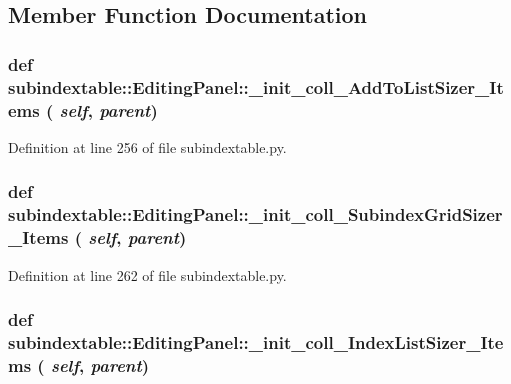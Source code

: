 \subsection{Member Function Documentation}
\hypertarget{classsubindextable_1_1EditingPanel_81852f5b97f68e5709560a4ff0d285fe}{
\subsubsection[\_\-init\_\-coll\_\-AddToListSizer\_\-Items]{\setlength{\rightskip}{0pt plus 5cm}def subindextable::Editing\-Panel::\_\-init\_\-coll\_\-Add\-To\-List\-Sizer\_\-Items ( {\em self},  {\em parent})}}
\label{classsubindextable_1_1EditingPanel_81852f5b97f68e5709560a4ff0d285fe}




Definition at line 256 of file subindextable.py.\hypertarget{classsubindextable_1_1EditingPanel_73356427a8bd3b439bda45420136686a}{
\subsubsection[\_\-init\_\-coll\_\-SubindexGridSizer\_\-Items]{\setlength{\rightskip}{0pt plus 5cm}def subindextable::Editing\-Panel::\_\-init\_\-coll\_\-Subindex\-Grid\-Sizer\_\-Items ( {\em self},  {\em parent})}}
\label{classsubindextable_1_1EditingPanel_73356427a8bd3b439bda45420136686a}




Definition at line 262 of file subindextable.py.\hypertarget{classsubindextable_1_1EditingPanel_91152d27972ad900edd7dbd3722f04e9}{
\subsubsection[\_\-init\_\-coll\_\-IndexListSizer\_\-Items]{\setlength{\rightskip}{0pt plus 5cm}def subindextable::Editing\-Panel::\_\-init\_\-coll\_\-Index\-List\-Sizer\_\-Items ( {\em self},  {\em parent})}}
\label{classsubindextable_1_1EditingPanel_91152d27972ad900edd7dbd3722f04e9}




